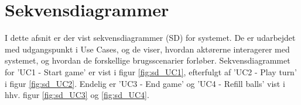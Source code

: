 \documentclass[Arkitektur/System_main.tex]{subfiles}
\begin{document}
\section{Sekvensdiagrammer}

I dette afsnit er der vist sekvensdiagrammer (SD) for systemet. De er udarbejdet med udgangspunkt i Use Cases, og de viser, hvordan aktørerne interagerer med systemet, og hvordan de forskellige brugsscenarier forløber. Sekvensdiagrammet for 'UC1 - Start game' er vist i figur \ref{fig:sd_UC1}, efterfulgt af 'UC2 - Play turn' i figur \ref{fig:sd_UC2}. Endelig er 'UC3 - End game' og 'UC4 - Refill balls' vist i hhv. figur \ref{fig:sd_UC3} og \ref{fig:sd_UC4}. \newpage





\end{document}
